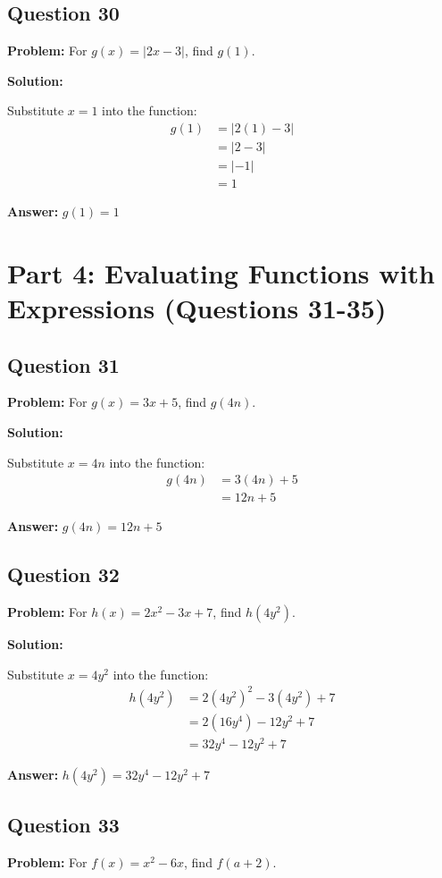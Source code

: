 \documentclass[12pt]{article}
\begin{document}
\subsection*{Question 30}
\textbf{Problem:} For $g(x) = |2x - 3|$, find $g(1)$.

\textbf{Solution:}

Substitute $x = 1$ into the function:
\begin{align*}
g(1) &= |2(1) - 3| \\
&= |2 - 3| \\
&= |-1| \\
&= 1
\end{align*}

\textbf{Answer:} $\boxed{g(1) = 1}$

\newpage

\section*{Part 4: Evaluating Functions with Expressions (Questions 31-35)}

\subsection*{Question 31}
\textbf{Problem:} For $g(x) = 3x + 5$, find $g(4n)$.

\textbf{Solution:}

Substitute $x = 4n$ into the function:
\begin{align*}
g(4n) &= 3(4n) + 5 \\
&= 12n + 5
\end{align*}

\textbf{Answer:} $\boxed{g(4n) = 12n + 5}$

\subsection*{Question 32}
\textbf{Problem:} For $h(x) = 2x^2 - 3x + 7$, find $h(4y^2)$.

\textbf{Solution:}

Substitute $x = 4y^2$ into the function:
\begin{align*}
h(4y^2) &= 2(4y^2)^2 - 3(4y^2) + 7 \\
&= 2(16y^4) - 12y^2 + 7 \\
&= 32y^4 - 12y^2 + 7
\end{align*}

\textbf{Answer:} $\boxed{h(4y^2) = 32y^4 - 12y^2 + 7}$

\subsection*{Question 33}
\textbf{Problem:} For $f(x) = x^2 - 6x$, find $f(a+2)$.
\end{document}
